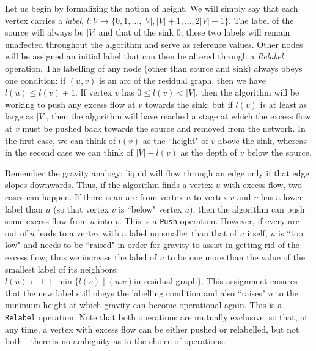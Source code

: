 \documentclass{article}
\begin{document}
Let us begin by formalizing the notion of height.  We will simply say
that each vertex carries a \emph{label},
$l\colon V\rightarrow\{0,1,\ldots,|V|,|V|+1,\ldots,2|V|-1\}$.
The label of the source will always be $|V|$ and that of the sink $0$;
these two labels will remain unaffected throughout the algorithm and
serve as reference values.  Other nodes will be assigned an initial label
that can then be altered through a \emph{Relabel} operation.  The labelling
of any node (other than source and sink) always obeys one condition:
if $(u,v)$ is an arc of the residual graph, then we have $l(u)\leq l(v)+1$.
If vertex $v$ has $0\leq l(v)< |V|$, then the algorithm will be working
to push any excess flow at $v$ towards the sink; but if $l(v)$ is at least
as large as $|V|$, then the algorithm will have reached a stage at which
the excess flow at $v$ must be pushed back towards the source and removed
from the network.  In the first case, we can think of $l(v)$ as the
``height" of $v$ above the sink, whereas in the second case we can
think of $|V|-l(v)$ as the depth of $v$ below the source.

Remember the gravity analogy: liquid will flow through an edge only if that
edge slopes downwards.  Thus, if the algorithm finds a vertex $u$ with excess
flow, two cases can happen.  If there is an arc from vertex $u$ to vertex $v$
and $v$ has a lower label than $u$ (so that vertex $v$ is ``below" vertex $u$),
then the algorithm can push some excess flow from $u$ into $v$.  This is a
\texttt{Push} operation.  However, if every arc out of $u$ leads to a vertex
with a label no smaller than that of $u$ itself, $u$ is ``too low" and needs to
be ``raised" in order for gravity to assist in getting rid of the excess flow;
thus we increase the label of $u$ to be one more than the value of the smallest
label of its neighbors: $l(u) \leftarrow 1+\min\{l(v) \mid (u.v) \text{in
residual graph}\}$.  This assignment ensures that the new label still obeys the
labelling condition and also ``raises" $u$ to the minimum height at which
gravity can become operational again.  This is a \texttt{Relabel} operation.
Note that both operations are mutually exclusive, so that, at any time, a
vertex with excess flow can be either pushed or relabelled, but not both---there
is no ambiguity as to the choice of operations.
\end{document}
